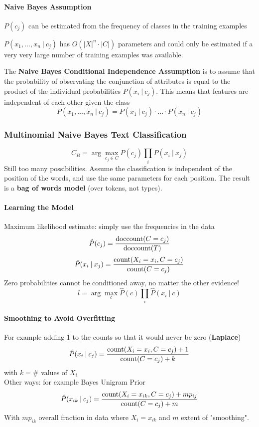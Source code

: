 \documentclass[10pt]{report}
\begin{document}
\paragraph{Naive Bayes Assumption}
\begin{list}{}{}
	\item $P(c_j)$ can be estimated from the frequency of classes in the training examples
	\item $P(x_1,\ldots,x_n\:|\:c_j)$ has $O(|X|^n\cdot |C|)$ parameters and could only be estimated if a very very large number of training examples was available.
\end{list}
The \textbf{Naive Bayes Conditional Independence Assumption} is to assume that the probability of observating the conjunction of attributes is equal to the product of the individual probabilities $P(x_i\:|\:c_j)$. This means that features are independent of each other given the class
$$P(x_1,\ldots,x_n\:|\:c_j) = P(x_1\:|\:c_j)\cdot\ldots\cdot P(x_n\:|\:c_j)$$
\subsubsection{Multinomial Naive Bayes Text Classification}
$$C_B = \arg\max_{c_j\in C}P(c_j)\prod_i P(x_i\:|\:x_j)$$
Still too many possibilities. Assume the classification is independent of the position of the words, and use the same parameters for each position. The result is a \textbf{bag of words model} (over tokens, not types).
\paragraph{Learning the Model} Maximum likelihood estimate: simply use the frequencies in the data
$$\hat{P}(c_j)=\frac{\hbox{doccount}(C = c_j)}{\hbox{doccount}(T)}$$
$$\hat{P}(x_i\:|\:x_j) = \frac{\hbox{count}(X_i = x_i, C = c_j)}{\hbox{count}(C = c_j)}$$
Zero probabilities cannot be conditioned away, no matter the other evidence!
$$l = \arg\max_c \hat{P}(c)\prod_i \hat{P}(x_i\:|\:c)$$
\paragraph{Smoothing to Avoid Overfitting} For example adding 1 to the counts so that it would never be zero (\textbf{Laplace}) 
$$\hat{P}(x_i\:|\:c_j) = \frac{\hbox{count}(X_i = x_i, C = c_j) + 1}{\hbox{count}(C = c_j) + k}$$
with $k = \#$ values of $X_i$\\
Other ways: for example Bayes Unigram Prior
$$\hat{P}(x_{ik}\:|\:c_j)=\frac{\hbox{count}(X_i = x_{ik}, C = c_j) + mp_{ij}}{\hbox{count}(C = c_j) + m}$$
With $mp_{ik}$ overall fraction in data where $X_i = x_{ik}$ and $m$ extent of "smoothing".
\end{document}
